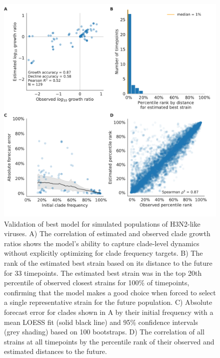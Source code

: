 \begin{figure}[H]
  \begin{center}
  \includegraphics[width=\textwidth]{figures/validation-of-best-model-for-simulated-populations.pdf}
  \caption{
  Validation of best model for simulated populations of H3N2-like viruses.
  A) The correlation of estimated and observed clade growth ratios shows the model's ability to capture clade-level dynamics without explicitly optimizing for clade frequency targets.
  B) The rank of the estimated best strain based on its distance to the future for 33 timepoints.
  The estimated best strain was in the top 20th percentile of observed closest strains for 100\% of timepoints, confirming that the model makes a good choice when forced to select a single representative strain for the future population.
  C) Absolute forecast error for clades shown in A by their initial frequency with a mean LOESS fit (solid black line) and 95\% confidence intervals (grey shading) based on 100 bootstraps.
  D) The correlation of all strains at all timepoints by the percentile rank of their observed and estimated distances to the future.
  }
  \label{sup_fig:validation_of_best_model_for_simulated_populations}
  \end{center}
\end{figure}

